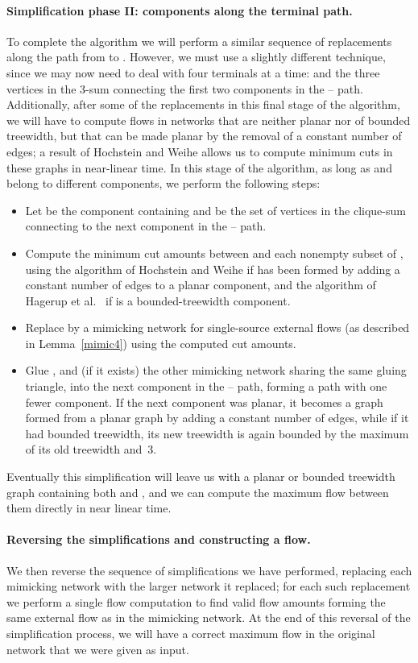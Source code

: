 \documentclass[runningheads]{llncs}
\begin{document}
\paragraph{\bf Simplification phase II: components along the terminal path.}
To complete the algorithm we will perform a similar sequence of replacements along the path from  to .  However, we must use a slightly different technique, since we may now need to deal with four terminals at a time:  and the three vertices in the 3-sum connecting the first two components in the -- path.  Additionally, after some of the replacements in this final stage of the algorithm, we will have to compute flows in networks that are neither planar nor of bounded treewidth, but that can be made planar by the removal of a constant number of edges; a result of Hochstein and Weihe \cite{hw-mstfkc-07} allows us to compute minimum cuts in these graphs in near-linear time. In this stage of the algorithm, as long as  and  belong to different components, we perform the following steps:
\begin{itemize}
\item Let  be the component containing  and  be the set of vertices in the clique-sum connecting  to the next component in the -- path.
\item Compute the minimum cut amounts between  and each nonempty subset of , using the algorithm of Hochstein and Weihe \cite{hw-mstfkc-07} if  has been formed by adding a constant number of edges to a planar component, and the algorithm of Hagerup et al.~\cite{hknr-cmfnc-98} if  is a bounded-treewidth component.
\item Replace  by a mimicking network  for single-source external flows (as described in Lemma~\ref{mimic4}) using the computed cut amounts.
\item Glue , and (if it exists) the other mimicking network sharing the same gluing triangle, into the next component in the -- path, forming a path with one fewer component. If the next component was planar, it becomes a graph formed from a planar graph by adding a constant number of edges, while if it had bounded treewidth, its new treewidth is again bounded by the maximum of its old treewidth and~3.
\end{itemize}
Eventually this simplification will leave us with a planar or bounded treewidth graph containing both  and , and we can compute the maximum flow between them directly in near linear time.

\paragraph{\bf Reversing the simplifications and constructing a flow.}
We then reverse the sequence of simplifications we have performed, replacing each mimicking network with the larger network it replaced; for each such replacement we perform a single flow computation to find valid flow amounts forming the same external flow as in the mimicking network. At the end of this reversal of the simplification process, we will have a correct maximum flow in the original network that we were given as input.
\end{document}
